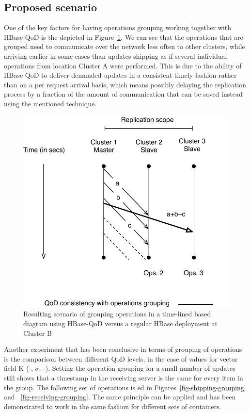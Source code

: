 \subsection{Proposed scenario}
One of the key factors for having operations grouping working together with HBase-QoD is the depicted in Figure~\ref{fig-qod-grouping}. We can see that the operations that are grouped need to communicate over the network less often to other clusters, while arriving earlier in some cases than updates shipping as if several individual operations from location Cluster A were performed. This is due to the ability of HBase-QoD to deliver demanded updates in a consistent timely-fashion rather than on a per request arrival basis, which means possibly delaying the replication process by a fraction of the amount of communication that can be saved instead using the mentioned technique.

\begin{figure}
\centering
\includegraphics[scale=0.6]{figs/operation-grouping.pdf}
\caption{Resulting scenario of grouping operations in a time-lined based diagram using HBase-QoD versus a regular HBase deployment at Cluster B}
\label{fig-qod-grouping}
\end{figure}

Another experiment that has been conclusive in terms of grouping of operations is the comparison between different QoD levels, in the case of values for vector field K (-, $\sigma$, -). Setting the operation grouping for a small number of updates still shows that a timestamp in the receiving server is the same for every item in the group. The following set of operations is ed in Figures~\ref{fig-shipping-grouping} and ~\ref{fig-receiving-grouping}. The same principle can be applied and has been demonstrated to work in the same fashion for different sets of containers.

